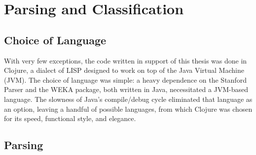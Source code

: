 \documentclass[main.tex]{subfiles}
\begin{document}
\section{Parsing and Classification}

\subsection{Choice of Language}

With very few exceptions, the code written in support of this thesis was done in Clojure, a dialect of LISP designed to work on top of the Java Virtual Machine (JVM). The choice of language was simple: a heavy dependence on the Stanford Parser and the WEKA package, both written in Java, necessitated a JVM-based language. The slowness of Java's compile/debug cycle eliminated that language as an option, leaving a handful of possible languages, from which Clojure was chosen for its speed, functional style, and elegance.

\subsection{Parsing}
\label{subsec:parsing}
\end{document}
